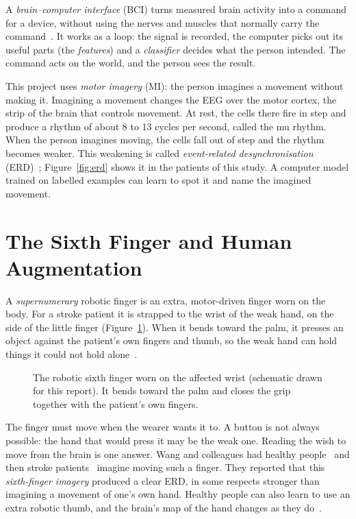 A \emph{brain--computer interface} (BCI) turns measured brain activity
into a command for a device, without using the nerves and muscles that normally carry
the command~\cite{wolpaw2002}. It works as a loop: the signal is
recorded, the computer picks out its useful parts (the \emph{features}) and a
\emph{classifier} decides what the person intended. The command acts on the world, and
the person sees the result.

This project uses \emph{motor imagery} (MI): the person imagines a movement without
making it. Imagining a movement changes the EEG over the motor cortex, the strip of the
brain that controls movement. At rest, the cells there fire in step and produce a
rhythm of about 8 to 13 cycles per second, called the mu rhythm. When the person imagines
moving, the cells fall out of step and the rhythm becomes weaker. This weakening is called \emph{event-related
desynchronisation} (ERD)~\cite{pfurtscheller1999,pfurtscheller2001}; Figure~\ref{fig:erd}
shows it in the patients of this study. A computer model
trained on labelled examples can learn to spot it and name the imagined movement.

\section{The Sixth Finger and Human Augmentation}\label{sec:intro-sixth}

A \emph{supernumerary} robotic finger is an extra, motor-driven finger worn on the body.
For a stroke patient it is strapped to the wrist of the weak hand, on the side of the
little finger (Figure~\ref{fig:sixth}). When it bends toward the palm, it presses an
object against the patient's own fingers and thumb, so the weak hand can hold things it
could not hold alone~\cite{prattichizzo2021,tong2021}.

\begin{figure}[tbp]
  \centering
  
  \caption[The robotic sixth finger worn on the affected wrist]{The robotic sixth finger worn on the affected wrist (schematic drawn for this
  report). It bends toward the palm and closes the grip together with the patient's own
  fingers.}
  \label{fig:sixth}
\end{figure}

The finger must move when the wearer wants it to. A button is not always possible: the
hand that would press it may be the weak one. Reading the wish to move from the brain is
one answer. Wang and colleagues had healthy people~\cite{wang2024jbhi} and then stroke
patients~\cite{wang2024tnsre} imagine moving such a finger. They reported that this
\emph{sixth-finger imagery} produced a clear ERD, in some respects stronger than imagining a
movement of one's own hand.
Healthy people can also learn to use an extra robotic thumb, and the brain's map of the
hand changes as they do~\cite{kieliba2021,eden2022}.

